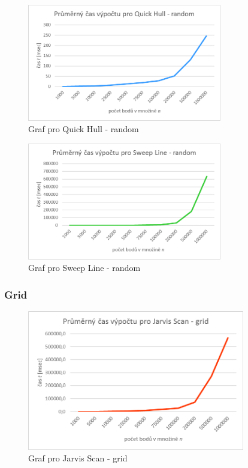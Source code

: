 \documentclass[a4paper, 12pt]{article}
\begin{document}
\begin{figure}[h!]
	\centering
	\includegraphics[width=8.5cm]{./pictures/g_rand_qh.png}
	\caption{Graf pro Quick Hull - random}
\end{figure}

\begin{figure}[h!]
	\centering
	\includegraphics[width=8.5cm]{./pictures/g_rand_sl.png}
	\caption{Graf pro Sweep Line - random}
\end{figure}
\clearpage

\subsubsection{Grid}
\begin{figure}[h!]
	\centering
	\includegraphics[width=9.5cm]{./pictures/g_grid_js.png}
	\caption{Graf pro Jarvis Scan - grid}
\end{figure}
\end{document}
